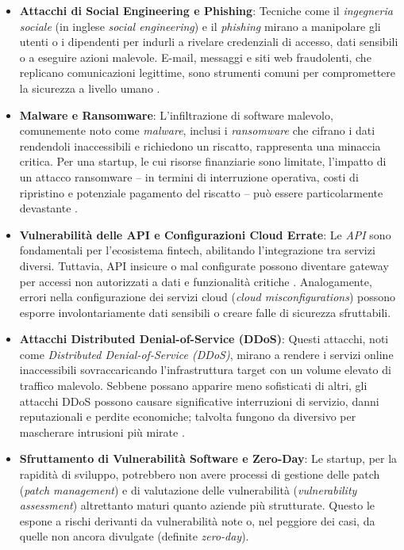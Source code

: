 \begin{itemize}
    \item \textbf{Attacchi di Social Engineering e Phishing}: Tecniche come il \textit{ingegneria sociale} (in inglese \textit{social engineering}) e il \textit{phishing} mirano a manipolare gli utenti o i dipendenti per indurli a rivelare credenziali di accesso, dati sensibili o a eseguire azioni malevole. E-mail, messaggi e siti web fraudolenti, che replicano comunicazioni legittime, sono strumenti comuni per compromettere la sicurezza a livello umano \cite{cyberThreatsfintech}.
    
    \item \textbf{Malware e Ransomware}: L'infiltrazione di software malevolo, comunemente noto come \textit{malware}, inclusi i \textit{ransomware} che cifrano i dati rendendoli inaccessibili e richiedono un riscatto, rappresenta una minaccia critica. Per una startup, le cui risorse finanziarie sono limitate, l'impatto di un attacco ransomware – in termini di interruzione operativa, costi di ripristino e potenziale pagamento del riscatto – può essere particolarmente devastante \cite{cyberThreatsfintech}.
    
    \item \textbf{Vulnerabilità delle API e Configurazioni Cloud Errate}: Le \textit{API} sono fondamentali per l'ecosistema fintech, abilitando l'integrazione tra servizi diversi. Tuttavia, API insicure o mal configurate possono diventare gateway per accessi non autorizzati a dati e funzionalità critiche \cite{fintechChallenges}. Analogamente, errori nella configurazione dei servizi cloud (\textit{cloud misconfigurations}) possono esporre involontariamente dati sensibili o creare falle di sicurezza sfruttabili.
    
    \item \textbf{Attacchi Distributed Denial-of-Service (DDoS)}: Questi attacchi, noti come \textit{Distributed Denial-of-Service (DDoS)}, mirano a rendere i servizi online inaccessibili sovraccaricando l'infrastruttura target con un volume elevato di traffico malevolo. Sebbene possano apparire meno sofisticati di altri, gli attacchi DDoS possono causare significative interruzioni di servizio, danni reputazionali e perdite economiche; talvolta fungono da diversivo per mascherare intrusioni più mirate \cite{fintechChallenges}.
    
    \item \textbf{Sfruttamento di Vulnerabilità Software e Zero-Day}: Le startup, per la rapidità di sviluppo, potrebbero non avere processi di gestione delle patch (\textit{patch management}) e di valutazione delle vulnerabilità (\textit{vulnerability assessment}) altrettanto maturi quanto aziende più strutturate. Questo le espone a rischi derivanti da vulnerabilità note o, nel peggiore dei casi, da quelle non ancora divulgate (definite \textit{zero-day}).
\end{itemize}

